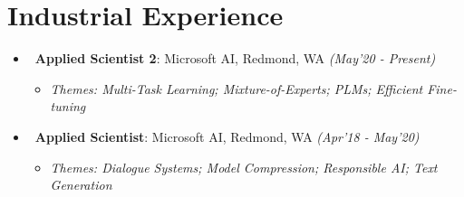 \section{\mysidestyle Industrial Experience}
\vspace{0mm}
\begin{itemize}[leftmargin=*]\compresslist
\item~\textbf{Applied Scientist 2}: Microsoft AI, Redmond, WA \hfill{\small\textit{(May'20 - Present)}} \vspace{-1mm}
\begin{itemize}[leftmargin=*]\compresslist
        \item[]\small\textit{Themes: Multi-Task Learning; Mixture-of-Experts; PLMs; Efficient Fine-tuning}
    \end{itemize}

\item~\textbf{Applied Scientist}: Microsoft AI, Redmond, WA \hfill{\small\textit{(Apr'18 - May'20)}} \vspace{-1mm}
\begin{itemize}[leftmargin=*]\compresslist
        \item[]\small\textit{Themes: Dialogue Systems; Model Compression; Responsible AI; Text Generation}
    \end{itemize}
\end{itemize}